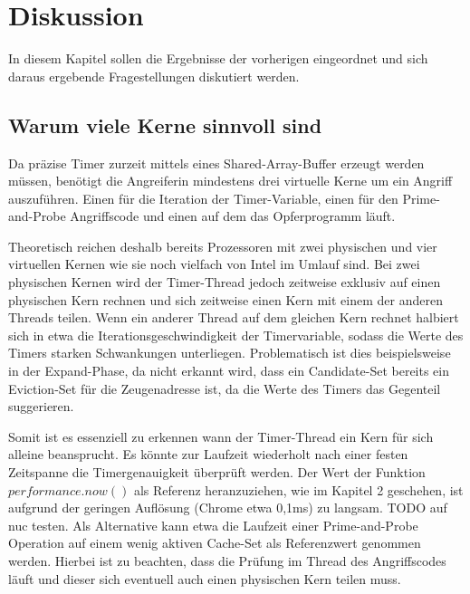 \chapter{Diskussion}
\label{chapter:discussion}

In diesem Kapitel sollen die Ergebnisse der vorherigen eingeordnet und sich daraus ergebende Fragestellungen diskutiert werden.


\section{Warum viele Kerne sinnvoll sind}
Da präzise Timer zurzeit mittels eines Shared-Array-Buffer erzeugt werden müssen, benötigt die Angreiferin mindestens drei virtuelle Kerne um ein Angriff auszuführen. Einen für die Iteration der Timer-Variable, einen für den Prime-and-Probe Angriffscode und einen auf dem das Opferprogramm läuft.

Theoretisch reichen deshalb bereits Prozessoren mit zwei physischen und vier virtuellen Kernen wie sie noch vielfach von Intel im Umlauf sind. Bei zwei physischen Kernen wird der Timer-Thread jedoch zeitweise exklusiv auf einen physischen Kern rechnen und sich zeitweise einen Kern mit einem der anderen Threads teilen.
Wenn ein anderer Thread auf dem gleichen Kern rechnet halbiert sich in etwa die Iterationsgeschwindigkeit der Timervariable, sodass die Werte des Timers starken Schwankungen unterliegen.
Problematisch ist dies beispielsweise in der Expand-Phase, da nicht erkannt wird, dass ein Candidate-Set bereits ein Eviction-Set für die Zeugenadresse ist, da die Werte des Timers das Gegenteil suggerieren.

Somit ist es essenziell zu erkennen wann der Timer-Thread ein Kern für sich alleine beansprucht.
Es könnte zur Laufzeit wiederholt nach einer festen Zeitspanne die Timergenauigkeit überprüft werden.
Der Wert der Funktion $performance.now()$ als Referenz heranzuziehen, wie im Kapitel 2 geschehen, ist aufgrund der geringen Auflösung (Chrome etwa 0,1ms) zu langsam.
TODO auf nuc testen.
Als Alternative kann etwa die Laufzeit einer Prime-and-Probe Operation auf einem wenig aktiven Cache-Set als Referenzwert genommen werden.
Hierbei ist zu beachten, dass die Prüfung im Thread des Angriffscodes läuft und dieser sich eventuell auch einen physischen Kern teilen muss.

